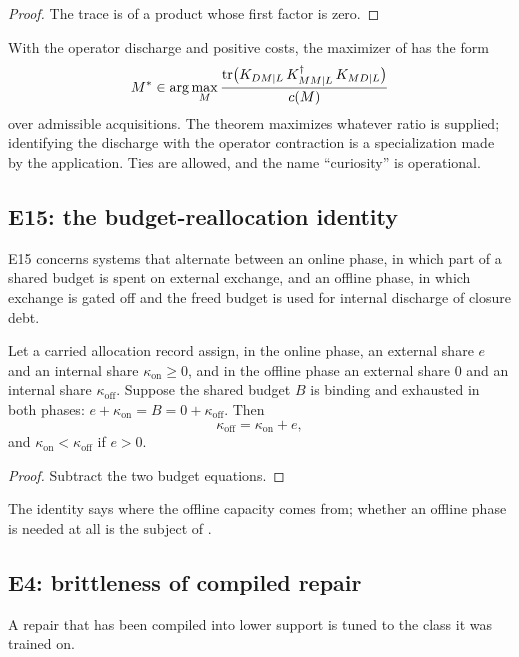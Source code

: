 \begin{proof}
The trace is of a product whose first factor is zero.
\end{proof}

With the operator discharge and positive costs, the maximizer of  has the form
\[
  M^* \in \arg\max_M \frac{\operatorname{tr}\bigl(K_{DM\mid L}\,K_{MM\mid L}^{\dagger}\,K_{MD\mid L}\bigr)}{c(M)}
\]
over admissible acquisitions. The theorem maximizes whatever ratio is supplied; identifying the
discharge with the operator contraction is a specialization made by the application. Ties are
allowed, and the name ``curiosity'' is operational.

\subsection{E15: the budget-reallocation identity}\label{sec:E15-identity}

E15 concerns systems that alternate between an online phase, in which part of a shared budget is
spent on external exchange, and an offline phase, in which exchange is gated off and the freed
budget is used for internal discharge of closure debt.

\begin{proposition}\label{prop:e15-identity}
Let a carried allocation record assign, in the online phase, an external share $e$ and an internal
share $\kappa_{\mathrm{on}} \ge 0$, and in the offline phase an external share $0$ and an internal
share $\kappa_{\mathrm{off}}$. Suppose the shared budget $B$ is binding and exhausted in both phases:
$e + \kappa_{\mathrm{on}} = B = 0 + \kappa_{\mathrm{off}}$. Then
\[
  \kappa_{\mathrm{off}} = \kappa_{\mathrm{on}} + e ,
\]
and $\kappa_{\mathrm{on}} < \kappa_{\mathrm{off}}$ if $e > 0$.
\end{proposition}

\begin{proof}
Subtract the two budget equations.
\end{proof}

The identity says where the offline capacity comes from; whether an offline phase is needed at all
is the subject of .

\subsection{E4: brittleness of compiled repair}\label{sec:E4-brittle}

A repair that has been compiled into lower support is tuned to the class it was trained on.

